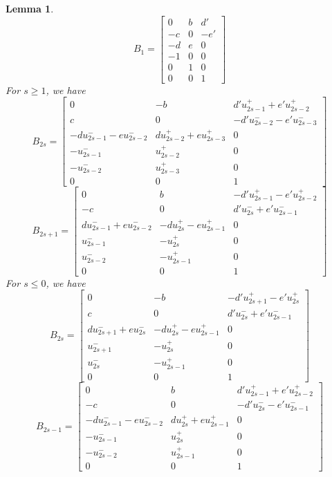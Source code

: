 \documentclass{amsart}
\newtheorem{lemma}[theorem]{Lemma}
\numberwithin{theorem}{section}
\begin{document}
  \begin{lemma}
    \[B_1=\left[\begin{array}{ccc} 0 & b & d' \\ -c & 0 & -e'\\ -d & e & 0\\ -1 & 0 & 0\\ 0 & 1 & 0\\ 0 & 0 & 1\end{array}\right]\]
    For $s\ge 1$, we have 
    \[B_{2s}=\left[\begin{array}{ccc} 0 & -b & d'u_{2s-1}^+ + e'u_{2s-2}^+ \\ c & 0 & -d'u_{2s-2}^- - e'u_{2s-3}^-\\ -du_{2s-1}^- - eu_{2s-2}^- &  du_{2s-2}^+ + eu_{2s-3}^+ & 0\\ -u_{2s-1}^- & u_{2s-2}^+ & 0\\ -u_{2s-2}^- & u_{2s-3}^+ & 0\\ 0 & 0 & 1\end{array}\right]\]
    \[B_{2s+1}=\left[\begin{array}{ccc} 0 & b & -d'u_{2s-1}^+ - e'u_{2s-2}^+ \\ -c & 0 & d'u_{2s}^- + e'u_{2s-1}^-\\ du_{2s-1}^- + eu_{2s-2}^- & -du_{2s}^+ - eu_{2s-1}^+ & 0\\ u_{2s-1}^- & -u_{2s}^+ & 0\\ u_{2s-2}^- & -u_{2s-1}^+ & 0\\ 0 & 0 & 1\end{array}\right]\]
    For $s\le 0$, we have
    \[B_{2s}=\left[\begin{array}{ccc} 0 & -b & -d'u_{2s+1}^+ - e'u_{2s}^+ \\ c & 0 & d'u_{2s}^- + e'u_{2s-1}^-\\ du_{2s+1}^- + eu_{2s}^- &  -du_{2s}^+ - eu_{2s-1}^+ & 0\\ u_{2s+1}^- & -u_{2s}^+ & 0\\ u_{2s}^- & -u_{2s-1}^+ & 0\\ 0 & 0 & 1\end{array}\right]\]
    \[B_{2s-1}=\left[\begin{array}{ccc} 0 & b & d'u_{2s-1}^+ + e'u_{2s-2}^+ \\ -c & 0 & -d'u_{2s}^- - e'u_{2s-1}^-\\ -du_{2s-1}^- - eu_{2s-2}^- & du_{2s}^+ + eu_{2s-1}^+ & 0\\ -u_{2s-1}^- & u_{2s}^+ & 0\\ -u_{2s-2}^- & u_{2s-1}^+ & 0\\ 0 & 0 & 1\end{array}\right]\]
  \end{lemma}
\end{document}
